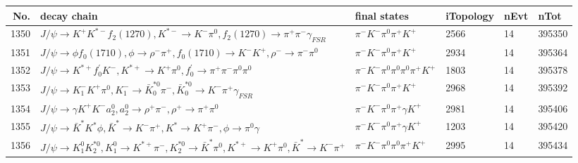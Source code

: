 \begin{table}[htbp] 
\begin{center}
\begin{small}
\begin{tabular}{rlllll}\hline\hline
 No. & decay chain & final states &  iTopology & nEvt & nTot \\\hline
1350&$J/\psi       \rightarrow K^{+}          K^{*-}         f_{2}(1270)    , K^{*-}          \rightarrow K^{-}          \pi^{0}        , f_{2}(1270)     \rightarrow \pi^{+}        \pi^{-}        \gamma_{FSR} $&$\pi^{-}        K^{-}          \pi^{0}        \pi^{+}        K^{+}          $& 2566&   14&395350\\
1351&$J/\psi       \rightarrow \phi           f_{0}(1710)    , \phi            \rightarrow \rho^{-}      \pi^{+}        , f_{0}(1710)     \rightarrow K^{-}          K^{+}          , \rho^{-}       \rightarrow \pi^{-}        \pi^{0}        $&$\pi^{-}        K^{-}          \pi^{0}        \pi^{+}        K^{+}          $& 2934&   14&395364\\
1352&$J/\psi       \rightarrow K^{*+}         f^{'}_{0}     K^{-}          , K^{*+}          \rightarrow K^{+}          \pi^{0}        , f^{'}_{0}      \rightarrow \pi^{+}        \pi^{-}        \pi^{0}        \pi^{0}        $&$\pi^{-}        K^{-}          \pi^{0}        \pi^{0}        \pi^{0}        \pi^{+}        K^{+}          $& 1803&   14&395378\\
1353&$J/\psi       \rightarrow K_{1}^{-}      K^{+}          \pi^{0}        , K_{1}^{-}       \rightarrow \bar{K}_0^{*0}\pi^{-}        , \bar{K}_0^{*0} \rightarrow K^{-}          \pi^{+}        \gamma_{FSR} $&$\pi^{-}        K^{-}          \pi^{0}        \pi^{+}        K^{+}          $& 2968&   14&395392\\
1354&$J/\psi       \rightarrow \gamma       K^{+}          K^{-}          a_{2}^{0}      , a_{2}^{0}       \rightarrow \rho^{+}      \pi^{-}        , \rho^{+}       \rightarrow \pi^{+}        \pi^{0}        $&$\pi^{-}        K^{-}          \pi^{0}        \pi^{+}        \gamma       K^{+}          $& 2981&   14&395406\\
1355&$J/\psi       \rightarrow \bar{K}^{*}   K^{*}          \phi           , \bar{K}^{*}    \rightarrow K^{-}          \pi^{+}        , K^{*}           \rightarrow K^{+}          \pi^{-}        , \phi            \rightarrow \pi^{0}        \gamma       $&$\pi^{-}        K^{-}          \pi^{0}        \pi^{+}        \gamma       K^{+}          $& 1203&   14&395420\\
1356&$J/\psi       \rightarrow K_1^{0}        K_2^{*0}       , K_1^{0}         \rightarrow K^{*+}         \pi^{-}        , K_2^{*0}        \rightarrow \bar{K}^{*}   \pi^{0}        , K^{*+}          \rightarrow K^{+}          \pi^{0}        , \bar{K}^{*}    \rightarrow K^{-}          \pi^{+}        $&$\pi^{-}        K^{-}          \pi^{0}        \pi^{0}        \pi^{+}        K^{+}          $& 2995&   14&395434\\

\end{tabular}
\end{small}
\end{center}
\end{table}
